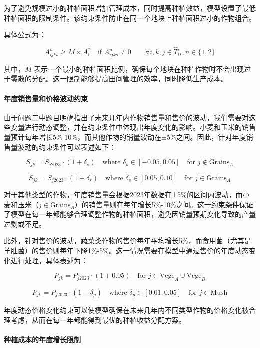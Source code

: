 \documentclass[12pt,a4paper]{nmmcm}
\begin{document}
为了避免规模过小的种植面积增加管理成本，同时提高种植效益，模型设置了最低种植面积的限制条件。该约束条件防止在同一个地块上种植面积过小的作物组合。

具体公式为：

\[
A_{ijks}^{n} \geq M \times A_i^*  \quad \text{if } A_{ijks}^{n} \neq 0 \qquad \forall i,k,j \in \hat{T}_{is},n \in \{1,2\}
\]

其中，$M$ 表示一个最小的种植面积比例，确保每个地块在种植作物时不会出现过于零散的分配。这一限制能够提高田间管理的效率，同时降低生产成本。

\paragraph{年度销售量和价格波动约束}

由于问题二中题目明确指出了未来几年内作物销售量和售价的波动，我们需要对这些变量进行动态调整，并在约束条件中体现出年度变化的影响。小麦和玉米的销售量预计每年增长5\%-10\%，而其他作物的销量波动在±5\%之间。因此，针对年度销售量波动的约束条件可以表述如下：

\[
S_{jk} = S_{j2023} \cdot (1 + \delta_s) \quad \text{where } \delta_s \in [-0.05, 0.05] \quad \text{for } j \notin \text{Grains}_A
\]

\[
S_{jk} = S_{j2023} \cdot (1 + \delta_s) \quad \text{where } \delta_s \in [0.05, 0.10] \quad \text{for } j \in \text{Grains}_A
\]

对于其他类型的作物，年度销售量会根据2023年数据在±5\%的区间内波动，而小麦和玉米（$j \in \text{Grains}_A$）的销售量则在每年增长5\%-10\%之间。这一约束条件保证了模型在每一年都能够合理调整作物的种植面积，避免因销量预期变化导致的产量过剩或不足。

此外，针对售价的波动，蔬菜类作物的售价每年平均增长5\%，而食用菌（尤其是羊肚菌）的售价则每年下降1\%-5\%。这一情况需要在模型中通过售价的年度动态变化进行处理，具体表述为：

\[
P_{jk} = P_{j2023} \cdot (1 + 0.05) \quad \text{for } j \in \text{Vege}_A \cup \text{Vege}_B
\]

\[
P_{jk} = P_{j2023} \cdot (1 - \delta_p) \quad \text{where } \delta_p \in [0.01, 0.05] \quad \text{for } j \in \text{Mush}
\]

年度动态价格变化约束可以使模型确保在未来几年内不同类型作物的价格变化被合理考虑，从而在每一年都能得到最优的种植收益分配方案。

\paragraph{种植成本的年度增长限制}
\end{document}
